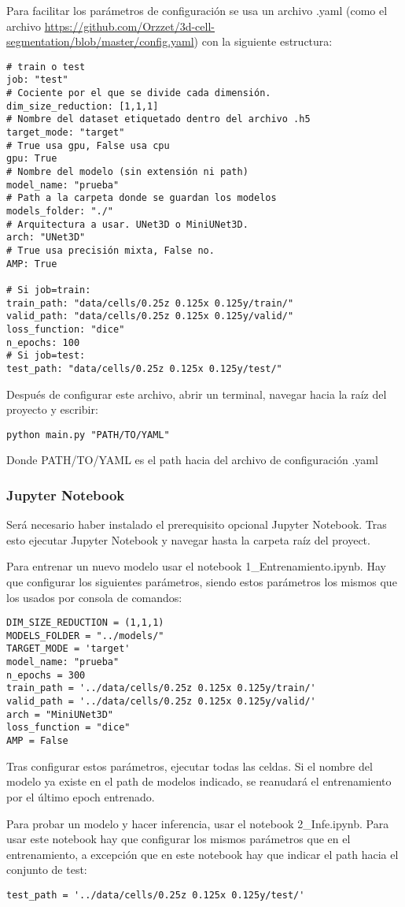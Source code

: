 Para facilitar los parámetros de configuración se usa un archivo .yaml (como el archivo \url{https://github.com/Orzzet/3d-cell-segmentation/blob/master/config.yaml}) con la siguiente estructura:
\begin{verbatim}
# train o test
job: "test" 
# Cociente por el que se divide cada dimensión.
dim_size_reduction: [1,1,1]
# Nombre del dataset etiquetado dentro del archivo .h5
target_mode: "target" 
# True usa gpu, False usa cpu
gpu: True
# Nombre del modelo (sin extensión ni path)
model_name: "prueba"
# Path a la carpeta donde se guardan los modelos 
models_folder: "./"
# Arquitectura a usar. UNet3D o MiniUNet3D. 
arch: "UNet3D"
# True usa precisión mixta, False no. 
AMP: True

# Si job=train:
train_path: "data/cells/0.25z 0.125x 0.125y/train/"
valid_path: "data/cells/0.25z 0.125x 0.125y/valid/"
loss_function: "dice"
n_epochs: 100
# Si job=test:
test_path: "data/cells/0.25z 0.125x 0.125y/test/"

\end{verbatim}

Después de configurar este archivo, abrir un terminal, navegar hacia la raíz del proyecto y escribir:

\begin{verbatim}
python main.py "PATH/TO/YAML"
\end{verbatim}

Donde PATH/TO/YAML es el path hacia del archivo de configuración .yaml

\subsubsection{Jupyter Notebook}

Será necesario haber instalado el prerequisito opcional Jupyter Notebook. Tras esto ejecutar Jupyter Notebook y navegar hasta la carpeta raíz del proyect.

Para entrenar un nuevo modelo usar el notebook 1\_Entrenamiento.ipynb. Hay que configurar los siguientes parámetros, siendo estos parámetros los mismos que los usados por consola de comandos:

\begin{verbatim}
DIM_SIZE_REDUCTION = (1,1,1)
MODELS_FOLDER = "../models/"
TARGET_MODE = 'target'
model_name: "prueba"
n_epochs = 300
train_path = '../data/cells/0.25z 0.125x 0.125y/train/'
valid_path = '../data/cells/0.25z 0.125x 0.125y/valid/'
arch = "MiniUNet3D"
loss_function = "dice"
AMP = False
\end{verbatim}

Tras configurar estos parámetros, ejecutar todas las celdas. Si el nombre del modelo ya existe en el path de modelos indicado, se reanudará el entrenamiento por el último epoch entrenado.

Para probar un modelo y hacer inferencia, usar el notebook 2\_Infe.ipynb. Para usar este notebook hay que configurar los mismos parámetros que en el entrenamiento, a excepción que en este notebook hay que indicar el path hacia el conjunto de test:

\verb|test_path = '../data/cells/0.25z 0.125x 0.125y/test/'|
